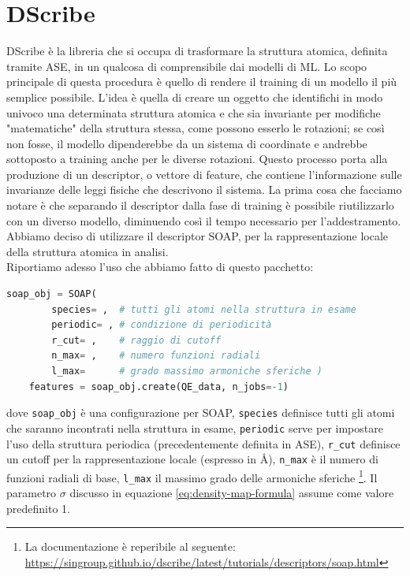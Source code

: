 \documentclass[a4paper,11pt,openany]{book}
\begin{document}
\section{DScribe} %
DScribe è la libreria \cite{dscribe-doc} che si occupa di trasformare la struttura atomica, definita tramite ASE, in un qualcosa di comprensibile dai modelli di ML. Lo scopo principale di questa procedura è quello di rendere il training di un modello il più semplice possibile. L'idea è quella di creare un oggetto che identifichi in modo univoco una determinata struttura atomica e che sia invariante per modifiche "matematiche" della struttura stessa, come possono esserlo le rotazioni; se così non fosse, il modello dipenderebbe da un sistema di coordinate e andrebbe sottoposto a training anche per le diverse rotazioni. Questo processo porta alla produzione di un descriptor, o vettore di feature, che contiene l'informazione sulle invarianze delle leggi fisiche che descrivono il sistema. La prima cosa che facciamo notare è che separando il descriptor dalla fase di training è possibile riutilizzarlo con un diverso modello, diminuendo così il tempo necessario per l'addestramento. Abbiamo deciso di utilizzare il descriptor SOAP, per la rappresentazione locale della struttura atomica in analisi. \cite{dscribe-intro,dscribe2}
\\

Riportiamo adesso l'uso che abbiamo fatto di questo pacchetto:

\begin{lstlisting}[caption={Snippet usato per la creazione delle feature tramite SOAP}, label={code:soap-dscribe}, language=Python]
    soap_obj = SOAP(
        species= ,  # tutti gli atomi nella struttura in esame
        periodic= , # condizione di periodicità    
        r_cut= ,    # raggio di cutoff
        n_max= ,    # numero funzioni radiali     
        l_max=      # grado massimo armoniche sferiche )
    features = soap_obj.create(QE_data, n_jobs=-1)
\end{lstlisting}

dove \texttt{soap\_obj} è una configurazione per SOAP, \texttt{species} definisce tutti gli atomi che saranno incontrati nella struttura in esame, \texttt{periodic} serve per impostare l'uso della struttura periodica (precedentemente definita in ASE), \texttt{r\_cut} definisce un cutoff per la rappresentazione locale (espresso in \r{A}), \texttt{n\_max} è il numero di funzioni radiali di base, \texttt{l\_max} il massimo grado delle armoniche sferiche \footnote{La documentazione è reperibile al seguente: \url{https://singroup.github.io/dscribe/latest/tutorials/descriptors/soap.html}}. Il parametro $\sigma$ discusso in equazione \eqref{eq:density-map-formula} assume come valore predefinito 1.
\end{document}
